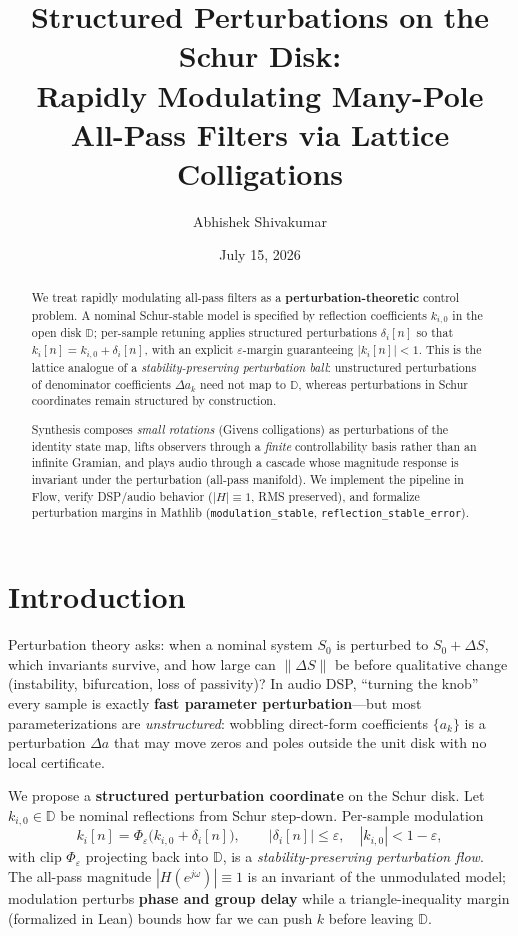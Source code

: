 \documentclass[11pt]{article}
\title{Structured Perturbations on the Schur Disk:\\
Rapidly Modulating Many-Pole All-Pass Filters via Lattice Colligations}
\author[1]{Abhishek Shivakumar}
\affil[1]{Independent research}
\date{July 15, 2026}
\begin{document}
\maketitle

\begin{abstract}
We treat rapidly modulating all-pass filters as a \textbf{perturbation-theoretic} control problem. A nominal Schur-stable model is specified by reflection coefficients $k_{i,0}$ in the open disk $\mathbb{D}$; per-sample retuning applies structured perturbations $\delta_i[n]$ so that $k_i[n]=k_{i,0}+\delta_i[n]$, with an explicit $\varepsilon$-margin guaranteeing $|k_i[n]|<1$. This is the lattice analogue of a \emph{stability-preserving perturbation ball}: unstructured perturbations of denominator coefficients $\Delta a_k$ need not map to $\mathbb{D}$, whereas perturbations in Schur coordinates remain structured by construction.

Synthesis composes \emph{small rotations} (Givens colligations) as perturbations of the identity state map, lifts observers through a \emph{finite} controllability basis rather than an infinite Gramian, and plays audio through a cascade whose magnitude response is invariant under the perturbation (all-pass manifold). We implement the pipeline in Flow, verify DSP/audio behavior ($|H|\equiv 1$, RMS preserved), and formalize perturbation margins in Mathlib (\texttt{modulation\_stable}, \texttt{reflection\_stable\_error}).
\end{abstract}

\section{Introduction}

Perturbation theory asks: when a nominal system $S_0$ is perturbed to $S_0+\Delta S$, which invariants survive, and how large can $\|\Delta S\|$ be before qualitative change (instability, bifurcation, loss of passivity)? In audio DSP, ``turning the knob'' every sample is exactly \textbf{fast parameter perturbation}---but most parameterizations are \emph{unstructured}: wobbling direct-form coefficients $\{a_k\}$ is a perturbation $\Delta a$ that may move zeros and poles outside the unit disk with no local certificate.

We propose a \textbf{structured perturbation coordinate} on the Schur disk. Let $k_{i,0}\in\mathbb{D}$ be nominal reflections from Schur step-down. Per-sample modulation
\[
k_i[n] = \Phi_\varepsilon\bigl(k_{i,0} + \delta_i[n]\bigr), \qquad |\delta_i[n]|\le\varepsilon,\quad |k_{i,0}|<1-\varepsilon,
\]
with clip $\Phi_\varepsilon$ projecting back into $\mathbb{D}$, is a \emph{stability-preserving perturbation flow}. The all-pass magnitude $|H(e^{j\omega})|\equiv 1$ is an invariant of the unmodulated model; modulation perturbs \textbf{phase and group delay} while a triangle-inequality margin (formalized in Lean) bounds how far we can push $k$ before leaving $\mathbb{D}$.
\end{document}
